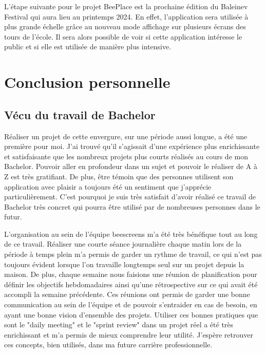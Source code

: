 L'étape suivante pour le projet BeePlace est la prochaine édition du Baleinev Festival qui aura lieu au printemps 2024. En effet, l'application sera utilisée à plus grande échelle grâce au nouveau mode affichage sur plusieurs écrans des tours de l'école. Il sera alors possible de voir si cette application intéresse le public et si elle est utilisée de manière plus intensive.

\section{Conclusion personnelle}

\subsection{Vécu du travail de Bachelor}

Réaliser un projet de cette envergure, sur une période aussi longue, a été une première pour moi. J'ai trouvé qu'il s'agissait d'une expérience plus enrichissante et satisfaisante que les nombreux projets plus courts réalisés au cours de mon Bachelor. Pouvoir aller en profondeur dans un sujet et pouvoir le réaliser de A à Z est très gratifiant. De plus, être témoin que des personnes utilisent son application avec plaisir a toujours été un sentiment que j'apprécie particulièrement. C'est pourquoi je suis très satisfait d'avoir réalisé ce travail de Bachelor très concret qui pourra être utilisé par de nombreuses personnes dans le futur.

L'organisation au sein de l'équipe \gls{beescreens} m'a été très bénéfique tout au long de ce travail. Réaliser une courte séance journalière chaque matin lors de la période à temps plein m'a permis de garder un rythme de travail, ce qui n'est pas toujours évident lorsque l'on travaille longtemps seul sur un projet depuis la maison. De plus, chaque semaine nous faisions une réunion de planification pour définir les objectifs hebdomadaires ainsi qu'une rétrospective sur ce qui avait été accompli la semaine précédente. Ces réunions ont permis de garder une bonne communication au sein de l'équipe et de pouvoir s'entraider en cas de besoin, en ayant une bonne vision d'ensemble des projets. Utiliser ces bonnes pratiques que sont le "daily meeting" et le "sprint review" dans un projet réel a été très enrichissant et m'a permis de mieux comprendre leur utilité. J'espère retrouver ces concepts, bien utilisés, dans ma future carrière professionnelle.

